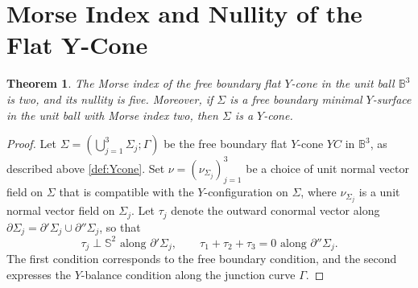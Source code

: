 \documentclass[11pt]{amsart}
\numberwithin{equation}{section}
\theoremstyle{theorem}
\newtheorem{theorem}{Theorem}[section]
\theoremstyle{definition}
\numberwithin{equation}{section}
\begin{document}
\section{Morse Index and Nullity of the Flat Y-Cone}
\begin{theorem}\label{thm:main2}
    The Morse index of the free boundary flat $Y$-cone in the unit ball $\mathbb{B}^3$ is two, and its nullity is five. Moreover, if $\Sigma$ is a free boundary minimal $Y$-surface in the unit ball with Morse index two, then $\Sigma$ is a $Y$-cone. 
\end{theorem}
\begin{proof}
Let  $\Sigma = (\bigcup_{j=1}^3 \Sigma_j; \Gamma)$ be the free boundary flat $Y$-cone $YC$ in $\mathbb{B}^3$, as described above \ref{def:Ycone}. Set $\nu=(\nu_{\Sigma_j})_{j=1}^3$ be a choice of unit normal vector field on $\Sigma$ that is compatible with the $Y$-configuration on $\Sigma$, where $\nu_{\Sigma_j}$ is a unit normal vector field on $\Sigma_j$. Let $\tau_j$ denote the outward conormal vector along 
$\partial \Sigma_j = \partial' \Sigma_j \cup \partial'' \Sigma_j$, so that
\[
\tau_j \perp \mathbb{S}^2 \text{ along } \partial' \Sigma_j, 
\qquad 
\tau_1 + \tau_2 + \tau_3 = 0 \text{ along } \partial'' \Sigma_j.
\]
The first condition corresponds to the free boundary condition, and the second expresses the $Y$-balance condition along the junction curve $\Gamma$.
\medskip


\end{proof}
\end{document}
